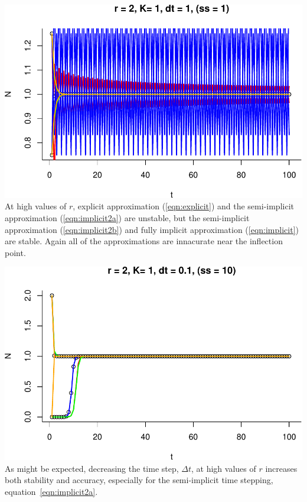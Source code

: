 \documentclass[12pt,letterpaper]{article}
\begin{document}
\includegraphics[width=\textwidth]{graphics/r2K1dt1ss1}
At high values of $r$, explicit approximation (\ref{eqn:explicit}) and
the semi-implicit approximation (\ref{eqn:implicit2a}) are unstable,
but the  semi-implicit approximation (\ref{eqn:implicit2b}) and fully
implicit approximation (\ref{eqn:implicit}) are stable. Again all of
the approximations are innacurate near the inflection point.

\includegraphics[width=\textwidth]{graphics/r2K1dt01ss10}
As might be expected,
decreasing the time step, $\Delta t$, at high values of $r$ increases
both stability and accuracy, especially for the semi-implicit time stepping, 
equation~\ref{eqn:implicit2a}.
\end{document}
